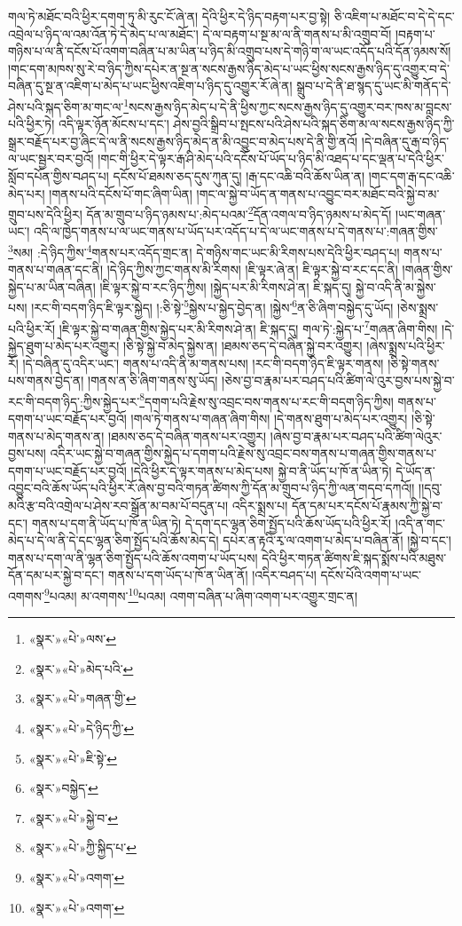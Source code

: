 གལ་ཏེ་མཐོང་བའི་ཕྱིར་དགག་ཏུ་མི་རུང་ངོ་ཞེ་ན། དེའི་ཕྱིར་དེ་ཉིད་བརྟག་པར་བྱ་སྟེ། ཅི་འཇིག་པ་མཐོང་བ་དེ་དེ་དང་འབྲེལ་པ་ཉིད་ལ་འམ་འོན་ཏེ་དེ་མེད་པ་ལ་མཐོང་། དེ་ལ་བརྟག་པ་སྔ་མ་ལ་ནི་གནས་པ་མི་འགྲུབ་བོ། །བརྟག་པ་གཉིས་པ་ལ་ནི་དངོས་པོ་འགག་བཞིན་པ་མ་ཡིན་པ་ཉིད་མི་འགྲུབ་པས་དེ་གཉི་ག་ལ་ཡང་འདོད་པའི་དོན་ཉམས་སོ། །གང་དག་མཁས་སུ་རེ་བ་ཉིད་ཀྱིས་དཔེར་ན་སྔ་ན་སངས་རྒྱས་ཉིད་མེད་པ་ཡང་ཕྱིས་སངས་རྒྱས་ཉིད་དུ་འགྱུར་བ་དེ་བཞིན་དུ་སྔ་ན་འཇིག་པ་མེད་པ་ཡང་ཕྱིས་འཇིག་པ་ཉིད་དུ་འགྱུར་རོ་ཞེ་ན། སྒྲུབ་པ་དེ་ནི་ཐ་སྙད་དུ་ཡང་མི་གནོད་དེ་ཤེས་པའི་སྐད་ཅིག་མ་གང་ལ་\footnote{«སྣར་»«པེ་»ལས་}སངས་རྒྱས་ཉིད་མེད་པ་དེ་ནི་ཕྱིས་ཀྱང་སངས་རྒྱས་ཉིད་དུ་འགྱུར་བར་ཁས་མ་བླངས་པའི་ཕྱིར་ཏེ། འདི་ལྟར་ཉོན་མོངས་པ་དང་། ཤེས་བྱའི་སྒྲིབ་པ་སྤངས་པའི་ཤེས་པའི་སྐད་ཅིག་མ་ལ་སངས་རྒྱས་ཉིད་ཀྱི་སྒྲར་བརྗོད་པར་བྱ་ཞིང་དེ་ལ་ནི་སངས་རྒྱས་ཉིད་མེད་ན་མི་འབྱུང་བ་མེད་པས་དེ་ནི་གྱི་ནའོ། །དེ་བཞིན་དུ་རྒ་བ་ཉིད་ལ་ཡང་སྦྱར་བར་བྱའོ། །གང་གི་ཕྱིར་དེ་ལྟར་རྒ་ཤི་མེད་པའི་དངོས་པོ་ཡོད་པ་ཉིད་མི་འཐད་པ་དང་ལྡན་པ་དེའི་ཕྱིར་སློབ་དཔོན་གྱིས་བཤད་པ། དངོས་པོ་ཐམས་ཅད་དུས་ཀུན་དུ། །རྒ་དང་འཆི་བའི་ཆོས་ཡིན་ན། །གང་དག་རྒ་དང་འཆི་མེད་པར། །གནས་པའི་དངོས་པོ་གང་ཞིག་ཡིན། །གང་ལ་སྐྱེ་བ་ཡོད་ན་གནས་པ་འབྱུང་བར་མཐོང་བའི་སྐྱེ་བ་མ་གྲུབ་པས་དེའི་ཕྱིར། དོན་མ་གྲུབ་པ་ཉིད་ཉམས་པ་:མེད་པའམ་\footnote{«སྣར་»«པེ་»མེད་པའི་}དོན་འགལ་བ་ཉིད་ཉམས་པ་མེད་དོ། །ཡང་གཞན་ཡང་། འདི་ལ་ཁྱེད་གནས་པ་ལ་ཡང་གནས་པ་ཡོད་པར་འདོད་པ་དེ་ལ་ཡང་གནས་པ་དེ་གནས་པ་:གཞན་གྱིས་\footnote{«སྣར་»«པེ་»གཞན་གྱི་}སམ། :དེ་ཉིད་ཀྱིས་\footnote{«སྣར་»«པེ་»དེ་ཉིད་ཀྱི་}གནས་པར་འདོད་གྲང་ན། དེ་གཉིས་གང་ཡང་མི་རིགས་པས་དེའི་ཕྱིར་བཤད་པ། གནས་པ་གནས་པ་གཞན་དང་ནི། །དེ་ཉིད་ཀྱིས་ཀྱང་གནས་མི་རིགས། །ཇི་ལྟར་ཞེ་ན། ཇི་ལྟར་སྐྱེ་བ་རང་དང་ནི། །གཞན་གྱིས་སྐྱེད་པ་མ་ཡིན་བཞིན། །ཇི་ལྟར་སྐྱེ་བ་རང་ཉིད་ཀྱིས། །སྐྱེད་པར་མི་རིགས་ཤེ་ན། ཇི་སྐད་དུ། སྐྱེ་བ་འདི་ནི་མ་སྐྱེས་པས། །རང་གི་བདག་ཉིད་ཇི་ལྟར་སྐྱེད། །:ཅི་སྟེ་\footnote{«སྣར་»«པེ་»ཇི་སྟེ་}སྐྱེས་པ་སྐྱེད་བྱེད་ན། །སྐྱེས་\footnote{«སྣར་»བསྐྱེད་}ན་ཅི་ཞིག་བསྐྱེད་དུ་ཡོད། །ཅེས་སྨྲས་པའི་ཕྱིར་རོ། །ཇི་ལྟར་སྐྱེ་བ་གཞན་གྱིས་སྐྱེད་པར་མི་རིགས་ཤེ་ན། ཇི་སྐད་དུ། གལ་ཏེ་:སྐྱེད་པ་\footnote{«སྣར་»«པེ་»སྐྱེ་བ་}གཞན་ཞིག་གིས། །དེ་སྐྱེད་ཐུག་པ་མེད་པར་འགྱུར། །ཅི་སྟེ་སྐྱེ་བ་མེད་སྐྱེས་ན། །ཐམས་ཅད་དེ་བཞིན་སྐྱེ་བར་འགྱུར། །ཞེས་སྨྲས་པའི་ཕྱིར་རོ། །དེ་བཞིན་དུ་འདིར་ཡང་། གནས་པ་འདི་ནི་མ་གནས་པས། །རང་གི་བདག་ཉིད་ཇི་ལྟར་གནས། །ཅི་སྟེ་གནས་པས་གནས་བྱེད་ན། །གནས་ན་ཅི་ཞིག་གནས་སུ་ཡོད། །ཅེས་བྱ་བ་རྣམ་པར་བཤད་པའི་ཚིག་ལེ་འུར་བྱས་པས་སྐྱེ་བ་རང་གི་བདག་ཉིད་:ཀྱིས་སྐྱེད་པར་\footnote{«སྣར་»«པེ་»ཀྱི་སྐྱིད་པ་}དགག་པའི་རྗེས་སུ་འབྲང་བས་གནས་པ་རང་གི་བདག་ཉིད་ཀྱིས། གནས་པ་དགག་པ་ཡང་བརྗོད་པར་བྱའོ། །གལ་ཏེ་གནས་པ་གཞན་ཞིག་གིས། །དེ་གནས་ཐུག་པ་མེད་པར་འགྱུར། །ཅི་སྟེ་གནས་པ་མེད་གནས་ན། །ཐམས་ཅད་དེ་བཞིན་གནས་པར་འགྱུར། །ཞེས་བྱ་བ་རྣམ་པར་བཤད་པའི་ཚིག་ལེའུར་བྱས་པས། འདིར་ཡང་སྐྱེ་བ་གཞན་གྱིས་སྐྱེད་པ་དགག་པའི་རྗེས་སུ་འབྲང་བས་གནས་པ་གཞན་གྱིས་གནས་པ་དགག་པ་ཡང་བརྗོད་པར་བྱའོ། །དེའི་ཕྱིར་དེ་ལྟར་གནས་པ་མེད་པས། སྐྱེ་བ་ནི་ཡོད་པ་ཁོ་ན་ཡིན་ཏེ། དེ་ཡོད་ན་འབྱུང་བའི་ཆོས་ཡོད་པའི་ཕྱིར་རོ་ཞེས་བྱ་བའི་གཏན་ཚིགས་ཀྱི་དོན་མ་གྲུབ་པ་ཉིད་ཀྱི་ལན་གདབ་དཀའོ།། །།དབུ་མའི་རྩ་བའི་འགྲེལ་པ་ཤེས་རབ་སྒྲོན་མ་བམ་པོ་བདུན་པ། འདིར་སྨྲས་པ། དོན་དམ་པར་དངོས་པོ་རྣམས་ཀྱི་སྐྱེ་བ་དང་། གནས་པ་དག་ནི་ཡོད་པ་ཁོ་ན་ཡིན་ཏེ། དེ་དག་དང་ལྷན་ཅིག་སྤྱོད་པའི་ཆོས་ཡོད་པའི་ཕྱིར་རོ། །འདི་ན་གང་མེད་པ་དེ་ལ་ནི་དེ་དང་ལྷན་ཅིག་སྤྱོད་པའི་ཆོས་མེད་དེ། དཔེར་ན་རྟའི་རྭ་ལ་འགག་པ་མེད་པ་བཞིན་ནོ། །སྐྱེ་བ་དང་། གནས་པ་དག་ལ་ནི་ལྷན་ཅིག་སྤྱོད་པའི་ཆོས་འགག་པ་ཡོད་པས། དེའི་ཕྱིར་གཏན་ཚིགས་ཇི་སྐད་སྨོས་པའི་མཐུས་དོན་དམ་པར་སྐྱེ་བ་དང་། གནས་པ་དག་ཡོད་པ་ཁོ་ན་ཡིན་ནོ། །འདིར་བཤད་པ། དངོས་པོའི་འགག་པ་ཡང་འགགས་\footnote{«སྣར་»«པེ་»འགག་}པའམ། མ་འགགས་\footnote{«སྣར་»«པེ་»འགག་}པའམ། འགག་བཞིན་པ་ཞིག་འགག་པར་འགྱུར་གྲང་ན། 